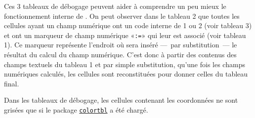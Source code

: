 \documentclass[french,a4paper,10pt]{article}
\newcommand*\ST{\textsf{\STname}\xspace}
\begin{document}
Ces 3 tableaux de débogage peuvent aider à comprendre un peu mieux le fonctionnement interne de \ST. On peut observer dans le tableau 2 que toutes les cellules ayant un champ numérique ont un code interne de 1 ou 2 (voir tableau 3) et ont un marqueur de champ numérique «\verb-:=-» qui leur est associé (voir tableau 1). Ce marqueur représente l'endroit où sera inséré ---~par substitution~--- le résultat du calcul du champ numérique. C'est donc à partir des contenus des champs textuels du tableau 1 et par simple substitution, qu'une fois les champs numériques calculés, les cellules sont reconstituées pour donner celles du tableau final.

Dans les tableaux de débogage, les cellules contenant les coordonnées ne sont grisées que si le package \href{https://ctan.org/pkg/colortbl}{\texttt{colortbl}} a été chargé.
\end{document}
